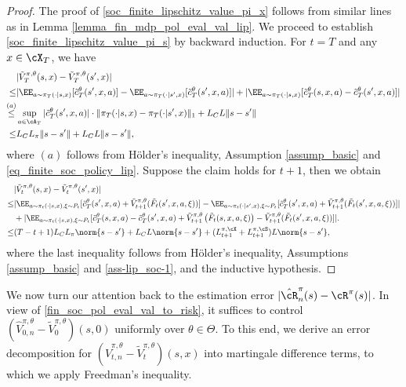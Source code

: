 \documentclass[9pt]{article}
\numberwithin{equation}{section}
\begin{document}
\begin{proof}
    The proof of \eqref{soc_finite_lipschitz_value_pi_x} follows from similar lines as in Lemma \ref{lemma_fin_mdp_pol_eval_val_lip}.
    We proceed to establish \eqref{soc_finite_lipschitz_value_pi_s} by backward induction.
For $t = T$ and any $x \in \cX_T$, we have
\begin{align*}
    & |\tilde V_T^{\pi, \theta}(s,x) - \tilde V_T^{\pi, \theta}(s',x)| \\
    \leq &|\EE_{a \sim \pi_T(\cdot|s,x)}[\tilde{c}_T^\theta(s',x,a)] - \EE_{a \sim \pi_T(\cdot|s',x)}[\tilde{c}_T^\theta(s',x,a)]| + {|\EE_{a \sim \pi_T(\cdot|s,x)}[\tilde{c}_T^\theta(s,x,a) - \tilde{c}_T^\theta(s',x,a)]}| \\
    \overset{(a)}{\leq} & \sup_{a \in \cA_T}|\tilde{c}_T^\theta(s',x,a)| \cdot \|\pi_T(\cdot|s,x) - \pi_T(\cdot|s',x)\|_1 + L_C L \|s - s'\| \\
    \leq & L_C L_\pi \|s-s'\| + L_C L\|s-s'\|,
\end{align*}
where $(a)$ follows from Hölder’s inequality, Assumption  \ref{assump_basic} and \eqref{eq_finite_soc_policy_lip}.  Suppose the claim holds for $t+1$, then we obtain
%
\begin{align}
    & |\tilde V_t^{\pi, \theta}(s,x) - \tilde V_t^{\pi, \theta}(s',x)| \nonumber \\
    \leq & |\EE_{a \sim \pi_t(\cdot|s,x), \xi \sim P_t}[\tilde{c}_T^\theta (s',x,a) + \tilde V_{t+1}^{\pi, \theta}( \tilde F_t(s',x,a,\xi))] - \EE_{a \sim \pi_t(\cdot|s',x), \xi \sim P_t}[\tilde{c}_T^\theta (s',x,a) + \tilde V_{t+1}^{\pi, \theta}( \tilde F_t(s',x,a,\xi))]| \nonumber \\
    & + | \EE_{a \sim \pi_t(\cdot|s,x), \xi \sim P_t}[\tilde{c}_T^\theta(s,x,a) - \tilde{c}_T^\theta(s',x,a) + \tilde V_{t+1}^{\pi, \theta}\left(\tilde F_t(s,x,a,\xi)\right) - \tilde V_{t+1}^{\pi, \theta}(\tilde F_t(s',x,a,\xi))]|. \nonumber \\
    \leq & (T-t+1)L_C L_\pi \norm{s-s'} + L_CL \norm{s-s'} + (L_{t+1}^{\pi, \cX} + L_{t+1}^{\pi, \cS})L \norm{s-s'}, \label{fin_soc_pol_eval_big_phi_lip}
\end{align}
where the last inequality follows from Hölder’s inequality, Assumptions \ref{assump_basic} and \ref{ass-lip_soc-1}, and the inductive hypothesis.
\end{proof}
We now turn our attention back to the estimation error $|\hat{\cR}_n^\pi(s)-\cR^\pi(s)|$. In view of \eqref{fin_soc_pol_eval_val_to_risk}, it suffices to control $(\hat{V}_{0,n}^{\pi,\theta}-\tilde{V}_0^{\pi,\theta})(s,0)$ uniformly over $\theta \in \Theta$. To this end, we derive an error decomposition for $(\hat{V}_{t,n}^{\pi,\theta}-\tilde{V}_t^{\pi,\theta})(s,x)$ into martingale difference terms, to which we apply Freedman's inequality.
\end{document}
